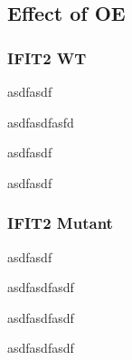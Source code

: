 \subsection{Effect of OE}
\subsubsection{IFIT2 WT}
asdfasdf

asdfasdfasfd

asdfasdf

asdfasdf

\subsubsection{IFIT2 Mutant}
asdfasdf

asdfasdfasdf

asdfasdfasdf

asdfasdfasdf